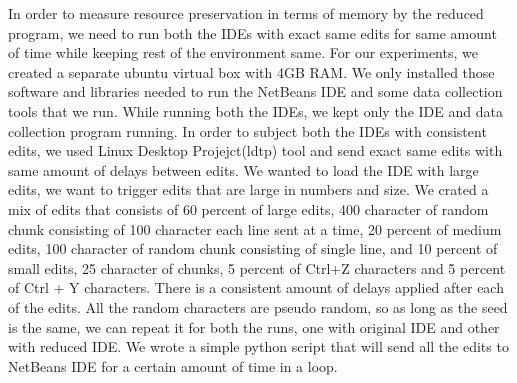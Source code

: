 In order to measure resource preservation in terms of memory by the reduced program, we need to run both the IDEs with exact same edits for same amount of time while keeping rest of the environment same. For our experiments, we created a separate ubuntu virtual box with 4GB RAM. We only installed those software and libraries needed to run the NetBeans IDE and some data collection tools that we run. While running both the IDEs, we kept only the IDE and data collection program running. In order to subject both the IDEs with consistent edits, we used Linux Desktop Projejct(ldtp) tool and send exact same edits with same amount of delays between edits. We wanted to load the IDE with large edits, we want to trigger edits that are large in numbers and size. We crated a mix of edits that consists of 60 percent of large edits, 400 character of random chunk consisting of 100 character each line sent at a time, 20 percent of medium edits, 100 character of random chunk consisting of single line, and 10 percent of small edits, 25 character of chunks, 5 percent of Ctrl+Z characters and 5 percent of Ctrl + Y characters. There is a consistent amount of delays applied after each of the edits. All the random characters are pseudo random, so as long as the seed is the same, we can repeat it for both the runs, one with original IDE and other with reduced IDE. We wrote a simple python script that will send all the edits to NetBeans IDE for a certain amount of time in a loop. 

